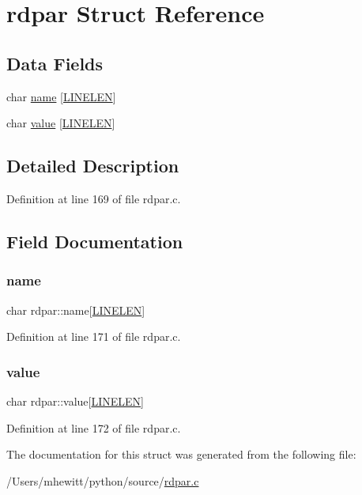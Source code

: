 \hypertarget{structrdpar}{}\section{rdpar Struct Reference}
\label{structrdpar}
\subsection*{Data Fields}
\begin{DoxyCompactItemize}
\item 
char \hyperlink{structrdpar_a50ea10aefeecc80ce3165df9cc9f8e35}{name} \mbox{[}\hyperlink{wind__updates2d_8c_a764eaf37b6117ac7a17b1c049c1d2d16}{L\+I\+N\+E\+L\+EN}\mbox{]}
\item 
char \hyperlink{structrdpar_a818582b82a87ae2f22b441e7990b0a64}{value} \mbox{[}\hyperlink{wind__updates2d_8c_a764eaf37b6117ac7a17b1c049c1d2d16}{L\+I\+N\+E\+L\+EN}\mbox{]}
\end{DoxyCompactItemize}


\subsection{Detailed Description}


Definition at line 169 of file rdpar.\+c.



\subsection{Field Documentation}
\mbox{\label{structrdpar_a50ea10aefeecc80ce3165df9cc9f8e35}} 
\subsubsection{\texorpdfstring{name}{name}}
{\footnotesize\ttfamily char rdpar\+::name\mbox{[}\hyperlink{wind__updates2d_8c_a764eaf37b6117ac7a17b1c049c1d2d16}{L\+I\+N\+E\+L\+EN}\mbox{]}}



Definition at line 171 of file rdpar.\+c.

\mbox{\label{structrdpar_a818582b82a87ae2f22b441e7990b0a64}} 
\subsubsection{\texorpdfstring{value}{value}}
{\footnotesize\ttfamily char rdpar\+::value\mbox{[}\hyperlink{wind__updates2d_8c_a764eaf37b6117ac7a17b1c049c1d2d16}{L\+I\+N\+E\+L\+EN}\mbox{]}}



Definition at line 172 of file rdpar.\+c.



The documentation for this struct was generated from the following file\+:\begin{DoxyCompactItemize}
\item 
/\+Users/mhewitt/python/source/\hyperlink{rdpar_8c}{rdpar.\+c}\end{DoxyCompactItemize}
